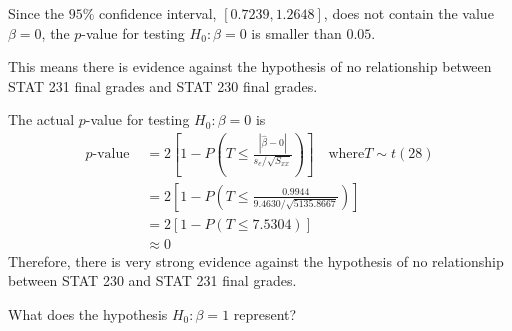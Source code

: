 \begin{exbox}
    \begin{example}[Testing $ H_0:\beta=0 $ for STAT 230/231 Final Grades]
        Since the $ 95\% $ confidence interval, $ \left[ 0.7239,1.2648 \right] $,
        does not contain the value $ \beta=0 $, the $ p $-value for testing
        $ H_0:\beta=0 $ is smaller than $ 0.05 $.

        This means there is evidence against the hypothesis of no relationship
        between STAT 231 final grades and STAT 230 final grades.
    \end{example}
\end{exbox}

\begin{exbox}
    \begin{example}
        The actual $ p $-value for testing $ H_0:\beta=0 $ is
        \[\begin{aligned}
                p\text{-value }
                 & =2\left[1-P\left(T \leq \frac{|\hat{\beta}-0|}{s_{e} / \sqrt{S_{x x}}}\right)\right]
                \quad \text{where}T \sim t(28)                                                          \\
                 & =2\left[1-P\left(T \leq \frac{0.9944}{9.4630 / \sqrt{5135.8667}}\right)\right]       \\
                 & =2[1-P(T \leq 7.5304)]                                                               \\
                 & \approx 0
            \end{aligned}\]
        Therefore, there is very strong evidence against the hypothesis of no relationship
        between STAT 230 and STAT 231 final grades.
    \end{example}
\end{exbox}

What does the hypothesis $ H_0:\beta=1 $ represent?

